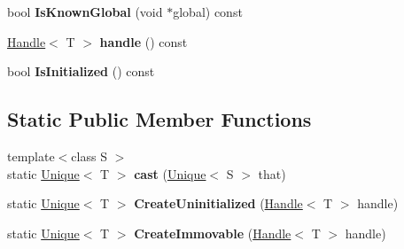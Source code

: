 \begin{DoxyCompactItemize}
\item 
bool {\bfseries Is\+Known\+Global} (void $\ast$global) const \hypertarget{classv8_1_1internal_1_1_unique_ae68470ebf29b25950c9b5bfc5191d623}{}\label{classv8_1_1internal_1_1_unique_ae68470ebf29b25950c9b5bfc5191d623}

\item 
\hyperlink{classv8_1_1internal_1_1_handle}{Handle}$<$ T $>$ {\bfseries handle} () const \hypertarget{classv8_1_1internal_1_1_unique_afe001d104f7116f25ec7f745d98a6407}{}\label{classv8_1_1internal_1_1_unique_afe001d104f7116f25ec7f745d98a6407}

\item 
bool {\bfseries Is\+Initialized} () const \hypertarget{classv8_1_1internal_1_1_unique_ac09a1ae14715003aeeeab2c4d4ad7323}{}\label{classv8_1_1internal_1_1_unique_ac09a1ae14715003aeeeab2c4d4ad7323}

\end{DoxyCompactItemize}
\subsection*{Static Public Member Functions}
\begin{DoxyCompactItemize}
\item 
{\footnotesize template$<$class S $>$ }\\static \hyperlink{classv8_1_1internal_1_1_unique}{Unique}$<$ T $>$ {\bfseries cast} (\hyperlink{classv8_1_1internal_1_1_unique}{Unique}$<$ S $>$ that)\hypertarget{classv8_1_1internal_1_1_unique_a359d060b11f122d9df79f2a27a8db9cf}{}\label{classv8_1_1internal_1_1_unique_a359d060b11f122d9df79f2a27a8db9cf}

\item 
static \hyperlink{classv8_1_1internal_1_1_unique}{Unique}$<$ T $>$ {\bfseries Create\+Uninitialized} (\hyperlink{classv8_1_1internal_1_1_handle}{Handle}$<$ T $>$ handle)\hypertarget{classv8_1_1internal_1_1_unique_acff014eaa7c4e0168feb2341cd1daf52}{}\label{classv8_1_1internal_1_1_unique_acff014eaa7c4e0168feb2341cd1daf52}

\item 
static \hyperlink{classv8_1_1internal_1_1_unique}{Unique}$<$ T $>$ {\bfseries Create\+Immovable} (\hyperlink{classv8_1_1internal_1_1_handle}{Handle}$<$ T $>$ handle)\hypertarget{classv8_1_1internal_1_1_unique_a721838c15b6958aabc7239717dae4119}{}\label{classv8_1_1internal_1_1_unique_a721838c15b6958aabc7239717dae4119}

\end{DoxyCompactItemize}
